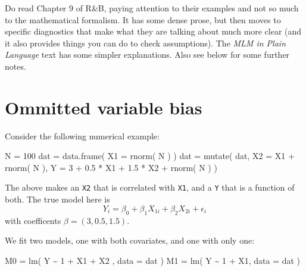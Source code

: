 \documentclass[
  letterpaper,
  DIV=11,
  numbers=noendperiod]{scrreprt}
\newenvironment{Shaded}{}{}
\newcommand{\AttributeTok}[1]{\textcolor[rgb]{0.49,0.56,0.16}{#1}}
\newcommand{\DecValTok}[1]{\textcolor[rgb]{0.25,0.63,0.44}{#1}}
\newcommand{\FloatTok}[1]{\textcolor[rgb]{0.25,0.63,0.44}{#1}}
\newcommand{\FunctionTok}[1]{\textcolor[rgb]{0.02,0.16,0.49}{#1}}
\newcommand{\NormalTok}[1]{#1}
\newcommand{\OtherTok}[1]{\textcolor[rgb]{0.00,0.44,0.13}{#1}}
\newcommand{\SpecialCharTok}[1]{\textcolor[rgb]{0.25,0.44,0.63}{#1}}
\begin{document}
Do read Chapter 9 of R\&B, paying attention to their examples and not so
much to the mathematical formalism. It has some dense prose, but then
moves to specific diagnostics that make what they are talking about much
more clear (and it also provides things you can do to check
assumptions). The \emph{MLM in Plain Language} text has some simpler
explanations. Also see below for some further notes.

\section{Ommitted variable bias}\label{ommitted-variable-bias}

Consider the following numerical example:

\begin{Shaded}
\begin{Highlighting}[]
\NormalTok{N }\OtherTok{=} \DecValTok{100}
\NormalTok{dat }\OtherTok{=} \FunctionTok{data.frame}\NormalTok{( }\AttributeTok{X1 =} \FunctionTok{rnorm}\NormalTok{( N ) )}
\NormalTok{dat }\OtherTok{=} \FunctionTok{mutate}\NormalTok{( dat, }
              \AttributeTok{X2 =}\NormalTok{ X1 }\SpecialCharTok{+} \FunctionTok{rnorm}\NormalTok{( N ),}
              \AttributeTok{Y =} \DecValTok{3} \SpecialCharTok{+} \FloatTok{0.5} \SpecialCharTok{*}\NormalTok{ X1 }\SpecialCharTok{+} \FloatTok{1.5} \SpecialCharTok{*}\NormalTok{ X2 }\SpecialCharTok{+} \FunctionTok{rnorm}\NormalTok{( N ) )}
\end{Highlighting}
\end{Shaded}

The above makes an \texttt{X2} that is correlated with \texttt{X1}, and
a \texttt{Y} that is a function of both. The true model here is
\[ Y_i = \beta_0 + \beta_1 X_{1i} + \beta_2 X_{2i} + \epsilon_{i} \]
with coefficents \(\beta = (3, 0.5, 1.5)\).

We fit two models, one with both covariates, and one with only one:

\begin{Shaded}
\begin{Highlighting}[]
\NormalTok{M0 }\OtherTok{=} \FunctionTok{lm}\NormalTok{( Y }\SpecialCharTok{\textasciitilde{}} \DecValTok{1} \SpecialCharTok{+}\NormalTok{ X1 }\SpecialCharTok{+}\NormalTok{ X2 , }\AttributeTok{data =}\NormalTok{ dat )}
\NormalTok{M1 }\OtherTok{=} \FunctionTok{lm}\NormalTok{( Y }\SpecialCharTok{\textasciitilde{}} \DecValTok{1} \SpecialCharTok{+}\NormalTok{ X1, }\AttributeTok{data =}\NormalTok{ dat )}
\end{Highlighting}
\end{Shaded}
\end{document}
